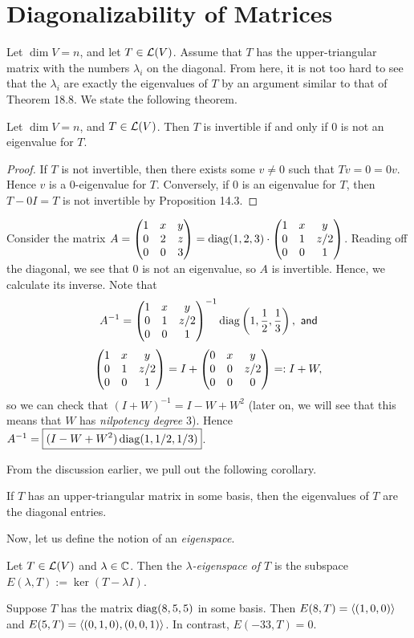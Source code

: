 \documentclass{article}
\begin{document}
\section{Diagonalizability of Matrices}
Let $\dim V = n$, and let $T\in\mathcal L(V)$. Assume that $T$ has the upper-triangular matrix with the numbers $\lambda_i$ on the diagonal. From here, it is not too hard to see that the $\lambda_i$ are exactly the eigenvalues of $T$ by an argument similar to that of Theorem 18.8. We state the following theorem.
\begin{theorem}
Let $\dim V = n$, and $T\in\mathcal L(V)$. Then $T$ is invertible if and only if $0$ is not an eigenvalue for $T$.
\end{theorem}
\begin{proof}
If $T$ is not invertible, then there exists some $v\neq 0$ such that $Tv = 0 = 0v$. Hence $v$ is a $0$-eigenvalue for $T$. Conversely, if $0$ is an eigenvalue for $T$, then $T-0I = T$ is not invertible by Proposition 14.3.
\end{proof}
\begin{example}
Consider the matrix $A = \begin{pmatrix}1 & x & y \\ 0 & 2 & z \\ 0 & 0 & 3 \end{pmatrix} = \operatorname{diag}(1, 2, 3)\cdot \begin{pmatrix}1 & x & y \\ 0 & 1 & z/2 \\ 0 & 0 & 1 \end{pmatrix}$. Reading off the diagonal, we see that $0$ is not an eigenvalue, so $A$ is invertible. Hence, we calculate its inverse. Note that
$$A^{-1} = \begin{pmatrix}1 & x & y \\ 0 & 1 & z/2 \\ 0 & 0 & 1 \end{pmatrix}^{-1} \operatorname{diag}\left(1, \frac 12, \frac 13 \right), \textsf{ and}$$
$$\begin{pmatrix}1 & x & y \\ 0 & 1 & z/2 \\ 0 & 0 & 1 \end{pmatrix} = I + \begin{pmatrix}0 & x & y \\ 0 & 0 & z/2 \\ 0 & 0 & 0 \end{pmatrix} =: I+W,$$
so we can check that $(I+W)^{-1} = I - W + W^2$ (later on, we will see that this means that $W$ has \textit{nilpotency degree} $3$). Hence $A^{-1} = \boxed{(I - W + W^2)\operatorname{diag}(1, 1/2, 1/3)}$.
\end{example}

From the discussion earlier, we pull out the following corollary.
\begin{corollary}
If $T$ has an upper-triangular matrix in some basis, then the eigenvalues of $T$ are the diagonal entries.
\end{corollary}
Now, let us define the notion of an \textit{eigenspace}.
\begin{definition}
Let $T\in\mathcal L(V)$ and $\lambda\in\mathbb C$. Then the \textit{$\lambda$-eigenspace of $T$} is the subspace $E(\lambda, T) := \ker(T-\lambda I)$.
\end{definition}
\newpage
\begin{example}
Suppose $T$ has the matrix $\operatorname{diag}(8, 5,5)$ in some basis. Then $E(8, T) = \left\langle(1, 0,0)\right\rangle$ and $E(5, T) = \left\langle(0, 1, 0), (0,0,1)\right\rangle$. In contrast, $E(-33, T) = 0$.
\end{example}
\end{document}
